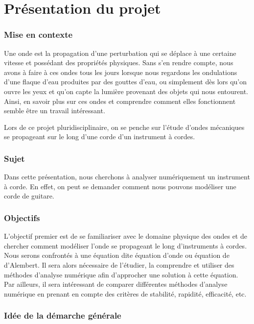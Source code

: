 \part{Présentation du projet}

\section{Mise en contexte}

Une onde est la propagation d'une perturbation qui se déplace à une certaine vitesse et possédant des propriétés physiques. Sans s'en rendre compte, nous avons à faire à ces ondes tous les jours lorsque nous regardons les ondulations d'une flaque d'eau produites par des gouttes d'eau, ou simplement dès lors qu'on ouvre les yeux et qu'on capte la lumière provenant des objets qui nous entourent. Ainsi, en savoir plus sur ces ondes et comprendre comment elles fonctionnent semble être un travail intéressant.

Lors de ce projet pluridisciplinaire, on se penche sur l'étude d'ondes mécaniques se propageant sur le long d'une corde d'un instrument à cordes.


\section{Sujet}

Dans cette présentation, nous cherchons  à analyser numériquement un instrument à corde. En effet, on peut se demander comment nous pouvons modéliser une corde de guitare. 

\section{Objectifs}

L'objectif premier est de se familiariser avec le domaine physique des ondes et de chercher comment modéliser l'onde se propageant le long d'instruments à cordes. Nous serons confrontés à une équation dite équation d'onde ou équation de d'Alembert. Il sera alors nécessaire de l'étudier, la comprendre et utiliser des méthodes d'analyse numérique afin d'approcher une solution à cette équation. Par ailleurs, il sera intéressant de comparer différentes méthodes d'analyse numérique en prenant en compte des critères de stabilité, rapidité, efficacité, etc.

\section{Idée de la démarche générale}

